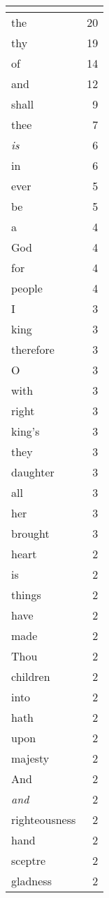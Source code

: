 \begin{center}
\begin{longtable}{l|r}
\hline \multicolumn{2}{c}{{ }} \\ \hline
\endfoot 
the & 20\\ \hline 
thy & 19\\ \hline 
of & 14\\ \hline 
and & 12\\ \hline 
shall & 9\\ \hline 
thee & 7\\ \hline 
\emph{is} & 6\\ \hline 
in & 6\\ \hline 
ever & 5\\ \hline 
be & 5\\ \hline 
a & 4\\ \hline 
God & 4\\ \hline 
for & 4\\ \hline 
people & 4\\ \hline 
I & 3\\ \hline 
king & 3\\ \hline 
therefore & 3\\ \hline 
O & 3\\ \hline 
with & 3\\ \hline 
right & 3\\ \hline 
king's & 3\\ \hline 
they & 3\\ \hline 
daughter & 3\\ \hline 
all & 3\\ \hline 
her & 3\\ \hline 
brought & 3\\ \hline 
heart & 2\\ \hline 
is & 2\\ \hline 
things & 2\\ \hline 
have & 2\\ \hline 
made & 2\\ \hline 
Thou & 2\\ \hline 
children & 2\\ \hline 
into & 2\\ \hline 
hath & 2\\ \hline 
upon & 2\\ \hline 
majesty & 2\\ \hline 
And & 2\\ \hline 
\emph{and} & 2\\ \hline 
righteousness & 2\\ \hline 
hand & 2\\ \hline 
sceptre & 2\\ \hline 
gladness & 2\\ \hline 

\end{longtable}
\end{center}
